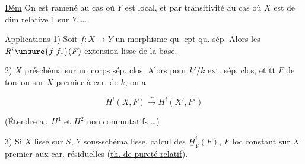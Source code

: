 
\uline{Dém} \quad On est ramené au cas où
$Y$ est   local, et par transitivité au cas
où $X$ est de dim relative 1 sur $Y$.\thinspace\ldots\thinspace.


\uline{Applications} 1) Soit $f:X\longrightarrow Y$ un morphisme qu. cpt
\llap{\smash{\rule[-2.1ex]{.4pt}{4.6ex}}\hspace{.65em}}qu. sép. Alors les $R^i\unsure{f|f_*}(F)$  
 extension lisse de la base.


2) $X$ préschéma sur un corps sép. clos. Alors
pour $k'/k$ ext. sép. clos, et tt $F$ de
torsion sur $X$ premier  à car. de $k$, on
a

\[ H^i(X,F)\xrightarrow{\sim}H^i(X',F') \]

(Étendre au $H^1$ et $H^2$ non commutatifs \ldots)

3) Si $X$ lisse sur $S$, $Y$ sous-schéma lisse,
calcul des $\underline H^i_Y(F)$, $F$ loc constant sur
$X$ premier aux car. résiduelles (\uline{th. de
pureté relatif}).

